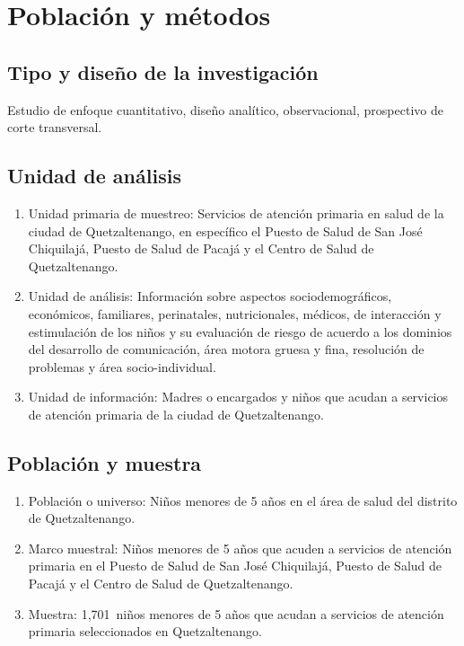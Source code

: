 \documentclass[11pt,letterpaper]{report}
\newcommand{\tiempito}{durante mayo de 2025}
\newcommand{\muestradeseada}{1,701}
\begin{document}
	\chapter{Población y métodos}
\section{Tipo y diseño de la investigación}
Estudio de enfoque cuantitativo, diseño analítico, observacional, prospectivo
de corte transversal.

\section{Unidad de análisis}
	\begin{enumerate}
		\item Unidad primaria de muestreo: Servicios de atención primaria en
		salud de la ciudad de Quetzaltenango, en específico el Puesto de
		Salud de San José Chiquilajá, Puesto de Salud de Pacajá y el Centro de
		Salud de Quetzaltenango.
		\item Unidad de análisis: Información sobre aspectos sociodemográficos,
		económicos, familiares, perinatales, nutricionales, médicos, de
		interacción y estimulación de los niños y su evaluación de riesgo de
		acuerdo a los dominios del desarrollo de comunicación, área motora
		gruesa y fina, resolución de problemas y área socio-individual.
		\item Unidad de información: Madres o encargados y niños que acudan a
		servicios de atención primaria de la ciudad de Quetzaltenango.
	\end{enumerate}

\section{Población y muestra}
	\begin{enumerate}
		\item Población o universo: Niños menores de 5 años en el área de salud
		del distrito de Quetzaltenango.
		\item Marco muestral: Niños menores de 5 años que acuden a servicios de
		atención primaria en el Puesto de Salud de San José Chiquilajá, Puesto
		de Salud de Pacajá y el Centro de Salud de Quetzaltenango. %
		\item Muestra: \muestradeseada\ niños menores de 5 años que acudan a
		servicios de atención primaria seleccionados en Quetzaltenango.
	\end{enumerate}
\end{document}
